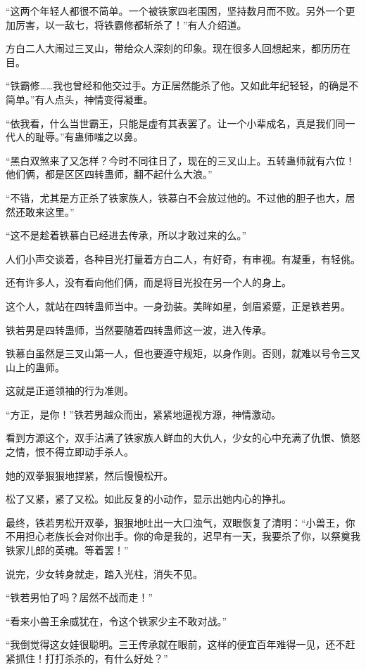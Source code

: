 \begin{this_body}
“这两个年轻人都很不简单。一个被铁家四老围困，坚持数月而不败。另外一个更加厉害，以一敌七，将铁霸修都斩杀了！”有人介绍道。

方白二人大闹过三叉山，带给众人深刻的印象。现在很多人回想起来，都历历在目。

“铁霸修……我也曾经和他交过手。方正居然能杀了他。又如此年纪轻轻，的确是不简单。”有人点头，神情变得凝重。

“依我看，什么当世霸王，只能是虚有其表罢了。让一个小辈成名，真是我们同一代人的耻辱。”有蛊师嗤之以鼻。

“黑白双煞来了又怎样？今时不同往日了，现在的三叉山上。五转蛊师就有六位！他们俩，都是区区四转蛊师，翻不起什么大浪。”

“不错，尤其是方正杀了铁家族人，铁慕白不会放过他的。不过他的胆子也大，居然还敢来这里。”

“这不是趁着铁慕白已经进去传承，所以才敢过来的么。”

人们小声交谈着，各种目光打量着方白二人，有好奇，有审视。有凝重，有轻佻。

还有许多人，没有看向他们俩，而是将目光投在另一个人的身上。

这个人，就站在四转蛊师当中。一身劲装。美眸如星，剑眉紧蹙，正是铁若男。

铁若男是四转蛊师，当然要随着四转蛊师这一波，进入传承。

铁慕白虽然是三叉山第一人，但也要遵守规矩，以身作则。否则，就难以号令三叉山上的蛊师。

这就是正道领袖的行为准则。

“方正，是你！”铁若男越众而出，紧紧地逼视方源，神情激动。

看到方源这个，双手沾满了铁家族人鲜血的大仇人，少女的心中充满了仇恨、愤怒之情，恨不得立即动手杀人。

她的双拳狠狠地捏紧，然后慢慢松开。

松了又紧，紧了又松。如此反复的小动作，显示出她内心的挣扎。

最终，铁若男松开双拳，狠狠地吐出一大口浊气，双眼恢复了清明：“小兽王，你不用担心老族长会对你出手。你的命是我的，迟早有一天，我要杀了你，以祭奠我铁家儿郎的英魂。等着罢！”

说完，少女转身就走，踏入光柱，消失不见。

“铁若男怕了吗？居然不战而走！”

“看来小兽王余威犹在，令这个铁家少主不敢对战。”

“我倒觉得这女娃很聪明。三王传承就在眼前，这样的便宜百年难得一见，还不赶紧抓住！打打杀杀的，有什么好处？”


\end{this_body}

